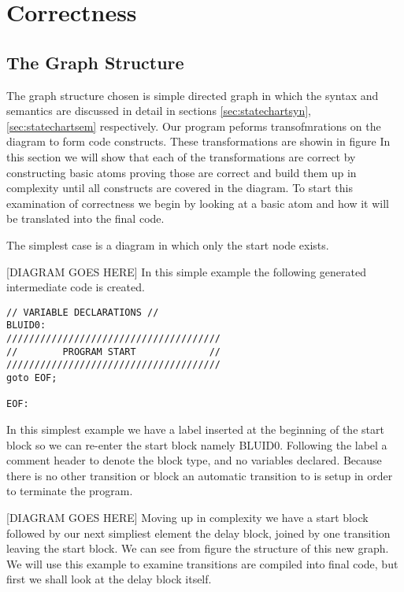 \section{Correctness}
\subsection{The Graph Structure}
The graph structure chosen is simple directed graph in which the syntax and semantics are discussed in detail in sections \ref{sec:statechartsyn}, \ref{sec:statechartsem} respectively. Our program peforms transofmrations on the diagram to form code constructs. These transformations are showin in figure 
In this section we will show that each of the transformations are correct by constructing basic atoms proving those are correct and build them up in complexity until all constructs are covered in the diagram. To start this examination of correctness we begin by looking at a basic atom and how it will be translated into the final code. 

The simplest case is a diagram in which only the start node exists.

[DIAGRAM GOES HERE]
In this simple example the following generated intermediate code  is created.

\begin{lstlisting}
// VARIABLE DECLARATIONS //
BLUID0:
//////////////////////////////////////
//        PROGRAM START             //
//////////////////////////////////////
goto EOF;

EOF:
\end{lstlisting}


In this simplest example we have a label inserted at the beginning of the start block so we can re-enter the start block namely BLUID0. Following the label a comment header to denote the block type, and no variables declared.  Because there is no other transition or block an automatic transition to  is setup in order to terminate the program.

[DIAGRAM GOES HERE]
Moving up in complexity we have a start block followed by our next simpliest element the delay block, joined by one transition leaving the start block. We can see from figure %
the structure of this new graph. We will use this example to examine transitions are compiled into final code, but first we shall look at the delay block itself.

